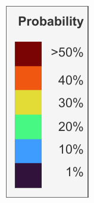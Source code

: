 \begin{figure}[H]
\begin{subfigure}[t]{0.06\textwidth}
        \includegraphics[width=\linewidth,height=3.65\linewidth]{figs_06/legend_probability.pdf}

\end{subfigure}
\end{figure}

